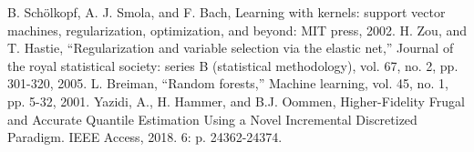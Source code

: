\documentclass[conference]{IEEEtran}
\begin{document}
\begin{thebibliography}{00}
 B. Schölkopf, A. J. Smola, and F. Bach, Learning with kernels: support vector machines, regularization, optimization, and beyond: MIT press, 2002.
 H. Zou, and T. Hastie, “Regularization and variable selection via the elastic net,” Journal of the royal statistical society: series B (statistical methodology), vol. 67, no. 2, pp. 301-320, 2005.
 L. Breiman, “Random forests,” Machine learning, vol. 45, no. 1, pp. 5-32, 2001.
 Yazidi, A., H. Hammer, and B.J. Oommen, Higher-Fidelity Frugal and Accurate Quantile Estimation Using a Novel Incremental Discretized Paradigm. IEEE Access, 2018. 6: p. 24362-24374.
\end{thebibliography}
\end{document}
